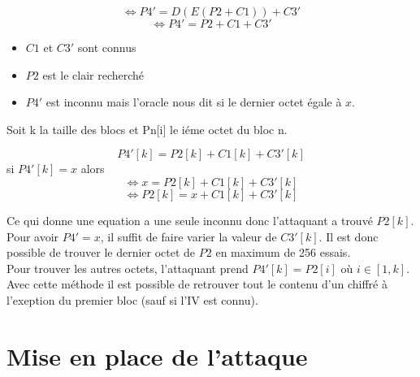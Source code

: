 \[\Longleftrightarrow P4' = D(E(P2 + C1)) + C3'\]
\[\Longleftrightarrow P4' = P2 + C1 + C3'\]
\begin{itemize}
\item $C1$ et $C3'$ sont connus
\item $P2$ est le clair recherché
\item $P4'$ est inconnu mais l'oracle nous dit si le dernier octet égale à $x$.
\end{itemize}
Soit k la taille des blocs et Pn[i] le iéme octet du bloc n.

\[P4'[k] = P2[k] + C1[k] + C3'[k]\] si $P4'[k] = x$ alors
\[\Longleftrightarrow x = P2[k] + C1[k] + C3'[k]\]
\[\Longleftrightarrow P2[k] = x + C1[k] + C3'[k]\]

Ce qui donne une equation a une seule inconnu donc l'attaquant a trouvé $P2[k]$.
Pour avoir $P4' = x$, il suffit de faire varier la valeur de $C3'[k]$. Il est donc
possible de trouver le dernier octet de $P2$ en maximum de 256 essais.\\

Pour trouver les autres octets, l'attaquant prend $P4'[k] = P2[i]$ où $i \in [1,k]$.
Avec cette méthode il est possible de retrouver tout le contenu d'un chiffré à
l'exeption du premier bloc (sauf si l'IV est connu).

\chapter{Mise en place de l'attaque}
\label{chapter:Poodleattack}


